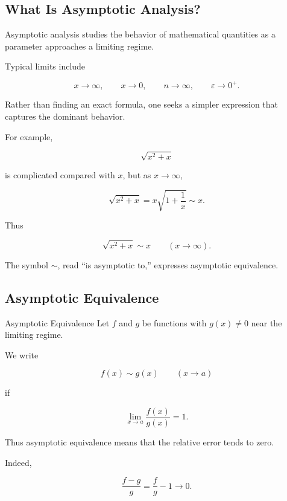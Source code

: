 \subsection{What Is Asymptotic Analysis?}
\label{subsec:what-is-asymptotic-analysis}

Asymptotic analysis studies the behavior of mathematical quantities as a
parameter approaches a limiting regime.

Typical limits include

\[
x\to\infty,
\qquad
x\to0,
\qquad
n\to\infty,
\qquad
\varepsilon\to0^+.
\]

Rather than finding an exact formula, one seeks a simpler expression that
captures the dominant behavior.

For example,

\[
\sqrt{x^2+x}
\]

is complicated compared with \(x\), but as \(x\to\infty\),

\[
\sqrt{x^2+x}
=
x\sqrt{1+\frac1x}
\sim x.
\]

Thus

\[
\boxed{
\sqrt{x^2+x}\sim x
\qquad
(x\to\infty).
}
\]

The symbol \(\sim\), read ``is asymptotic to,'' expresses asymptotic
equivalence.

\subsection{Asymptotic Equivalence}
\label{subsec:asymptotic-equivalence}

\begin{definitionbox}{Asymptotic Equivalence}
Let \(f\) and \(g\) be functions with \(g(x)\neq0\) near the limiting
regime.

We write

\[
\boxed{
f(x)\sim g(x)
\qquad
(x\to a)
}
\]

if

\[
\boxed{
\lim_{x\to a}
\frac{f(x)}{g(x)}
=
1.
}
\]
\end{definitionbox}

Thus asymptotic equivalence means that the relative error tends to zero.

Indeed,

\[
\frac{f-g}{g}
=
\frac{f}{g}-1
\to0.
\]

